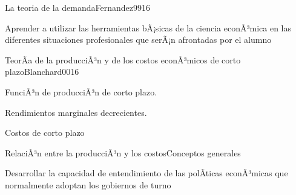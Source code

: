 \begin{syllabus}
\begin{unit}{La teoria de la demanda}{Fernandez99}{16}
\begin{unitgoals}
      \item Aprender a utilizar las herramientas bÃ¡sicas de la ciencia econÃ³mica en las diferentes situaciones profesionales que serÃ¡n afrontadas por el alumno
   \end{unitgoals}
\end{unit}


\begin{unit}{TeorÃ­a de la producciÃ³n y de los costos econÃ³micos de corto plazo}{Blanchard00}{16}
\begin{topics}
	\item FunciÃ³n de producciÃ³n de corto plazo.
	\item Rendimientos marginales decrecientes.
	\item Costos de corto plazo
	\item RelaciÃ³n entre la producciÃ³n y los costosConceptos generales
\end{topics}

\begin{unitgoals}
      \item Desarrollar la capacidad de entendimiento de las polÃ­ticas econÃ³micas que normalmente adoptan los gobiernos de turno
   \end{unitgoals}
\end{unit}

\begin{coursebibliography}
\end{coursebibliography}
\end{syllabus}





